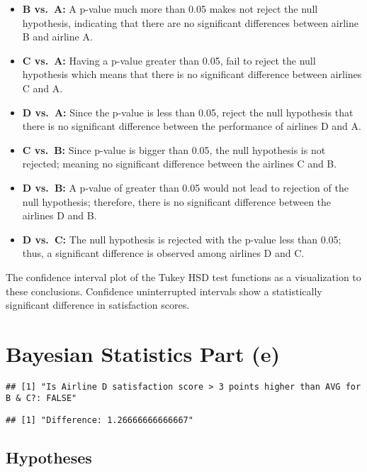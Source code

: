 \documentclass[
]{article}
\providecommand{\tightlist}{%
  \setlength{\itemsep}{0pt}\setlength{\parskip}{0pt}}
\begin{document}
\begin{itemize}
\tightlist
\item
  \textbf{B vs.~A:} A p-value much more than 0.05 makes not reject the
  null hypothesis, indicating that there are no significant differences
  between airline B and airline A.
\item
  \textbf{C vs.~A:} Having a p-value greater than 0.05, fail to reject
  the null hypothesis which means that there is no significant
  difference between airlines C and A.
\item
  \textbf{D vs.~A:} Since the p-value is less than 0.05, reject the null
  hypothesis that there is no significant difference between the
  performance of airlines D and A.
\item
  \textbf{C vs.~B:} Since p-value is bigger than 0.05, the null
  hypothesis is not rejected; meaning no significant difference between
  the airlines C and B.
\item
  \textbf{D vs.~B:} A p-value of greater than 0.05 would not lead to
  rejection of the null hypothesis; therefore, there is no significant
  difference between the airlines D and B.
\item
  \textbf{D vs.~C:} The null hypothesis is rejected with the p-value
  less than 0.05; thus, a significant difference is observed among
  airlines D and C.
\end{itemize}

The confidence interval plot of the Tukey HSD test functions as a
visualization to these conclusions. Confidence uninterrupted intervals
show a statistically significant difference in satisfaction scores.

\section{Bayesian Statistics Part (e)}\label{bayesian-statistics-part-e}

\begin{verbatim}
## [1] "Is Airline D satisfaction score > 3 points higher than AVG for B & C?: FALSE"
\end{verbatim}

\begin{verbatim}
## [1] "Difference: 1.26666666666667"
\end{verbatim}

\subsection{Hypotheses}\label{hypotheses}
\end{document}
